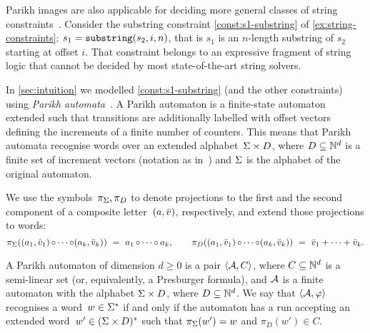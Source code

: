 Parikh images are also applicable for deciding more general classes of string
constraints~\cite{ostrich-plus}. Consider the substring constraint
\cref{const:s1-substring} of \cref{ex:string-constraints}: $ s_1 =
\operatorname{\mathtt{substring}}(s_2, i, n)$, that is $s_1$ is an $n$-length substring of $s_2$
starting at offset $i$.
That constraint belongs to an expressive fragment of string logic that
cannot be decided by most state-of-the-art string solvers.

In \cref{sec:intuition} we modelled \cref{const:s1-substring} (and the
other constraints) using \emph{Parikh
  automata}~\cite{parikh-automata,expressiveness}. A Parikh automaton
is a finite-state automaton extended such that transitions are
additionally labelled with offset vectors defining the increments
of a finite number of counters.  This means that Parikh automata
recognise words over an extended alphabet~$\Sigma \times D$, where
$D \subseteq \mathbb{N}^d$ is a finite set of increment vectors
(notation as in~\cite{expressiveness}) and $\Sigma$ is the alphabet
of the original automaton.
  
  We use the symbols~$\pi_\Sigma, \pi_D$ to denote projections to the first
  and the second component of a composite letter~$(a, \bar{v})$,
  respectively, and extend those projections to words:
\begin{equation*}
  \pi_\Sigma((a_1, \bar{v}_1) \operatorname{\circ} \cdots \operatorname{\circ} (a_k, \bar{v}_k))
  ~=~ a_1 \operatorname{\circ} \cdots \operatorname{\circ} a_k,
  \qquad
  \pi_D((a_1, \bar{v}_1) \operatorname{\circ} \cdots \operatorname{\circ} (a_k, \bar{v}_k))
  ~=~ \bar{v}_1 + \cdots + \bar{v}_k.
\end{equation*}

\begin{definition}\label{def:parikh-automata} A Parikh automaton of dimension $d
  \geq 0$ is a pair $\left\langle\mathcal{A}, C\right\rangle$, where
  $C \subseteq \mathbb{N}^d$ is a semi-linear set (or, equivalently, a
  Presburger formula), and $\mathcal{A}$ is a finite automaton with the
  alphabet $\Sigma \times D$, where $D \subseteq \mathbb{N}^d$. We
  say that $\left\langle\mathcal{A}, \varphi\right\rangle$ recognises a
  word~$w \in \Sigma^*$ if and only if the automaton has a run
  accepting an extended word~$w' \in (\Sigma \times D)^*$ such that
  $\pi_\Sigma(w') = w$ and $\pi_D(w') \in C$.
\end{definition}

